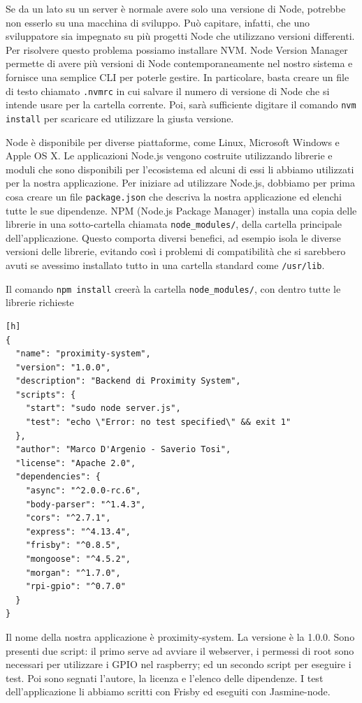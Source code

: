 Se da un lato su un server è normale avere solo una versione di Node, potrebbe non esserlo su una macchina di sviluppo.
Può capitare, infatti, che uno sviluppatore sia impegnato su più progetti Node che utilizzano versioni differenti.
Per risolvere questo problema possiamo installare NVM.
Node Version Manager permette di avere più versioni di Node contemporaneamente nel nostro sistema e fornisce una semplice CLI per poterle gestire.
In particolare, basta creare un file di testo chiamato \texttt{.nvmrc} in cui salvare il numero di versione di Node che si intende usare per la cartella corrente.
Poi, sarà sufficiente digitare il comando \texttt{nvm install} per scaricare ed utilizzare la giusta versione.

Node è disponibile per diverse piattaforme, come Linux, Microsoft Windows e Apple OS X.
Le applicazioni Node.js vengono costruite utilizzando librerie e moduli che sono disponibili per l'ecosistema ed alcuni di essi li abbiamo utilizzati per la nostra applicazione.
Per iniziare ad utilizzare Node.js, dobbiamo per prima cosa creare un file \texttt{package.json} che descriva la nostra applicazione ed elenchi tutte le sue dipendenze.
NPM (Node.js Package Manager) installa una copia delle librerie in una sotto-cartella chiamata \texttt{node\_modules/}, della cartella principale dell'applicazione. 
Questo comporta diversi benefici, ad esempio isola le diverse versioni delle librerie, evitando così i problemi di compatibilità che si sarebbero avuti se avessimo installato tutto in una cartella standard come \texttt{/usr/lib}.

Il comando \texttt{npm install} creerà la cartella \texttt{node\_modules/}, con dentro tutte le librerie richieste

\begin{lstlisting}[caption={package.json}, style=javaScriptCode][h]
{
  "name": "proximity-system",
  "version": "1.0.0",
  "description": "Backend di Proximity System",
  "scripts": {
    "start": "sudo node server.js",
    "test": "echo \"Error: no test specified\" && exit 1"
  },
  "author": "Marco D'Argenio - Saverio Tosi",
  "license": "Apache 2.0",
  "dependencies": {
    "async": "^2.0.0-rc.6",
    "body-parser": "^1.4.3",
    "cors": "^2.7.1",
    "express": "^4.13.4",
    "frisby": "^0.8.5",
    "mongoose": "^4.5.2",
    "morgan": "^1.7.0",
    "rpi-gpio": "^0.7.0"
  }
}
\end{lstlisting}

Il nome della nostra applicazione è proximity-system. 
La versione è la 1.0.0. 
Sono presenti due script: il primo serve ad avviare il webserver, i permessi di root sono necessari per utilizzare i GPIO nel raspberry; ed un secondo script per eseguire i test. 
Poi sono segnati l'autore, la licenza e l'elenco delle dipendenze. 
I test dell'applicazione li abbiamo scritti con Frisby ed eseguiti con Jasmine-node.

